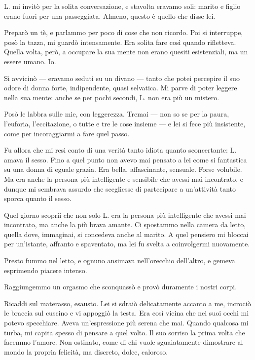 \documentclass[a4paper,12pt]{book}
\begin{document}
L. mi invitò per la solita conversazione, e stavolta eravamo soli: marito e
figlio erano fuori per una passeggiata. Almeno, questo è quello che disse lei.

Preparò un tè, e parlammo per poco di cose che non ricordo. Poi si interruppe,
posò la tazza, mi guardò intensamente. Era solita fare così quando rifletteva.
Quella volta, però, a occupare la sua mente non erano quesiti esistenziali, ma
un essere umano. Io.

Si avvicinò --- eravamo seduti su un divano --- tanto che potei percepire il suo
odore di donna forte, indipendente, quasi selvatica. Mi parve di poter leggere
nella sua mente: anche se per pochi secondi, L. non era più un mistero.

Posò le labbra sulle mie, con leggerezza. Tremai --- non so se per la paura,
l'euforia, l'eccitazione, o tutte e tre le cose insieme --- e lei si fece più
insistente, come per incoraggiarmi a fare quel passo.

Fu allora che mi resi conto di una verità tanto idiota quanto sconcertante:
L. amava il sesso. Fino a quel punto non avevo mai pensato a lei come si
fantastica su una donna di eguale grazia. Era bella, affascinante, sensuale.
Forse volubile. Ma era anche la persona più intelligente e sensibile che avessi
mai incontrato, e dunque mi sembrava assurdo che scegliesse di partecipare a
un'attività tanto sporca quanto il sesso.

Quel giorno scoprii che non solo L. era la persona più intelligente che avessi
mai incontrato, ma anche la più brava amante. Ci spostammo nella camera da
letto, quella dove, immaginai, si concedeva anche al marito. A quel pensiero mi
bloccai per un'istante, affranto e spaventato, ma lei fu svelta a coinvolgermi
nuovamente.

Presto fummo nel letto, e ognuno ansimava nell'orecchio dell'altro, e gemeva
esprimendo piacere intenso.

Raggiungemmo un orgasmo che sconquassò e provò duramente i nostri corpi.

Ricaddi sul materasso, esausto. Lei si sdraiò delicatamente accanto a me,
incrociò le braccia sul cuscino e vi appoggiò la testa. Era così vicina che nei
suoi occhi mi potevo specchiare. Aveva un'espressione più serena che mai. Quando
qualcosa mi turba, mi capita spesso di pensare a quel volto. Il suo sorriso la
prima volta che facemmo l'amore. Non ostinato, come di chi vuole sguaiatamente
dimostrare al mondo la propria felicità, ma discreto, dolce, caloroso.
\end{document}
